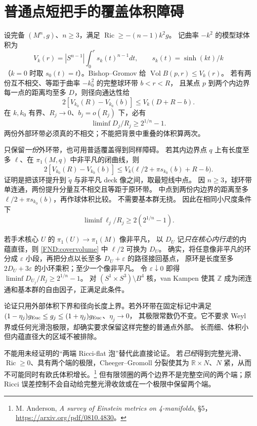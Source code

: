 \documentclass[UTF8,fontset=fandol,zihao=-4,oneside,openany]{ctexbook}
\theoremstyle{cjkplain}
\numberwithin{equation}{chapter}
\DeclareMathOperator{\Ric}{Ric}
\begin{document}
\section{普通点短把手的覆盖体积障碍}
\label{FND:short-handle}

设完备 \((M^n,g)\)、\(n\ge3\)，满足 \(\Ric\ge-(n-1)k^2g\)。
记曲率 \(-k^2\) 的模型球体积为
\[
V_k(r)=|S^{n-1}|\int_0^r s_k(t)^{n-1}dt,\qquad
s_k(t)=\sinh(kt)/k
\]
（\(k=0\) 时取 \(s_0(t)=t\)）。Bishop--Gromov 给 \(\operatorname{Vol}B(p,r)\le V_k(r)\)。
若有两份互不相交、等距于曲率 \(-k_0^2\) 的完整球环带 \(b<r<R\)，
且某点 \(p\) 到两个内边界每一点的距离均至多 \(D\)，则径向通达性给
\[
2[V_{k_0}(R)-V_{k_0}(b)]\le V_k(D+R-b).
\]
在 \(k,k_0\) 有界、\(R_j\to0\)、\(b_j=o(R_j)\) 下，必有
\[
\liminf D_j/R_j\ge2^{1/n}-1.
\]
两份外部环带必须真的不相交；不能把背景中重叠的体积算两次。

只保留\emph{一份}外环带，也可用普适覆盖得到同样障碍。
若其内边界点 \(q\) 上有长度至多 \(\ell\)、在 \(\pi_1(M,q)\) 中非平凡的闭曲线，则
\begin{equation}\label{FND:covervolume}
2[V_{k_0}(R)-V_{k_0}(b)]
\le V_k\bigl(\ell/2+\pi s_{k_0}(b)+R-b\bigr).
\end{equation}
证明是把该环提升到 \(\widetilde q\) 与非平凡 deck 像之间，取最短线中点。
因 \(n\ge3\)，球环带单连通，两份提升分量互不相交且等距于原环带。
中点到两份内边界的距离至多 \(\ell/2+\pi s_{k_0}(b)\)，再作球体积比较。
不需要基本群无挠。
因此在相同小尺度条件下
\[
\liminf\ell_j/R_j\ge2(2^{1/n}-1).
\]

若手术核心 \(U\) 的 \(\pi_1(U)\to\pi_1(M)\) 像非平凡，
以 \(D_U\) 记\emph{只在核心内行走}的内蕴直径，则 \eqref{FND:covervolume} 中 \(\ell/2\) 可换为 \(D_U\)。
确实，将任意像非平凡的环分成 \(\varepsilon\) 小段，再把分点以长至多 \(D_U+\varepsilon\) 的路径接回基点，
原环是长度至多 \(2D_U+3\varepsilon\) 的小环乘积；至少一个像非平凡。
令 \(\varepsilon\downarrow0\) 即得
\(\liminf D_{U_j}/R_j\ge2^{1/n}-1\)。
对 \((S^1\times S^3)\setminus B^4\) 核，van Kampen 使其 \(\mathbb Z\) 成为闭连通和基本群的自由因子，正满足此条件。

论证只用外部体积下界和径向长度上界。若外环带在固定标记中满足
\((1-\eta_j)g_{\rm Euc}\le g_j\le(1+\eta_j)g_{\rm Euc}\)、\(\eta_j\to0\)，
其极限常数仍不变。它不要求 Weyl 界或任何光滑泡极限，却确实要求保留这样完整的普通点外部。
长而细、体积小但内蕴直径大的区域不被排除。

不能用未经证明的“两端 Ricci-flat 泡”替代此直接论证。
若\emph{已经}得到完整光滑、\(\Ric\ge0\)、具有两个端的极限，Cheeger--Gromoll 分裂使其为
\(\mathbb R\times N\)、\(N\) 紧，从而不可能同时有欧氏体积增长。\footnote{M. Anderson, \emph{A survey of Einstein metrics on 4-manifolds}, \S5，\url{https://arxiv.org/pdf/0810.4830}。}
但有限领圈的两个边界不是完整空间的两个端；原 Ricci 误差控制不会自动给完整光滑收敛或在一个极限中保留两个端。
\end{document}
